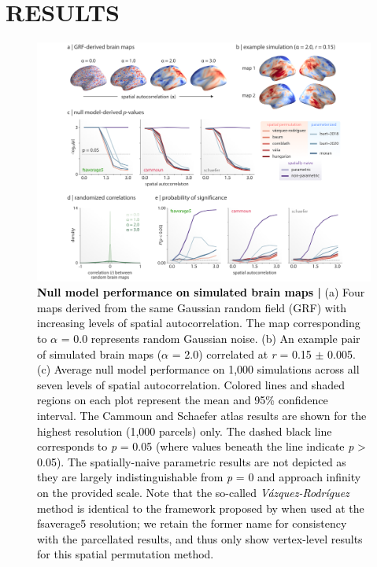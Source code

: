 \documentclass[12pt,aps,pra,reprint,showkeys]{revtex4-1}
\newcommand{\nimg}[1]{\textcolor{black}{{#1}}}
\begin{document}
\section*{RESULTS}

\begin{figure}[htp]
  \begin{center}
    \centerline{\includegraphics[width=\textwidth]{simulation_results.png}}
    \caption{
      \nimg{\textbf{Null model performance on simulated brain maps |}
      (a) Four maps derived from the same Gaussian random field (GRF) with increasing levels of spatial autocorrelation.
      The map corresponding to $\alpha$ = 0.0 represents random Gaussian noise.
      (b) An example pair of simulated brain maps ($\alpha$ = 2.0) correlated at \emph{r} = 0.15 $\pm$ 0.005.
      (c) Average null model performance on 1,000 simulations across all seven levels of spatial autocorrelation.
      Colored lines and shaded regions on each plot represent the mean and 95\% confidence interval.
      The Cammoun and Schaefer atlas results are shown for the highest resolution (1,000 parcels) only.
      The dashed black line corresponds to \emph{p} = 0.05 (where values beneath the line indicate \emph{p} > 0.05).
      The spatially-naive parametric results are not depicted as they are largely indistinguishable from \emph{p} = 0 and approach infinity on the provided scale.
      Note that the so-called \textit{V{\'a}zquez-Rodr{\'i}guez} method is identical to the framework proposed by \citet{alexanderbloch2018neuroimage} when used at the fsaverage5 resolution; we retain the former name for consistency with the parcellated results, and thus only show vertex-level results for this spatial permutation method.
}}
\end{center}
\end{figure}
\end{document}
